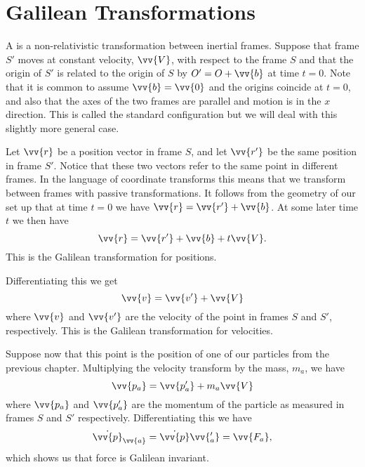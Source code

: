 \documentclass[fleqn]{NotesClass}
\begin{document}
    \section{Galilean Transformations}
    A  is a non-relativistic transformation between inertial frames.
    Suppose that frame \(S'\) moves at constant velocity, \(\vv{V}\), with respect to the frame \(S\) and that the origin of \(S'\) is related to the origin of \(S\) by \(O' = O + \vv{b}\) at time \(t = 0\).
    Note that it is common to assume \(\vv{b} = \vv{0}\) and the origins coincide at \(t = 0\), and also that the axes of the two frames are parallel and motion is in the \(x\) direction.
    This is called the standard configuration but we will deal with this slightly more general case.
    
    Let \(\vv{r}\) be a position vector in frame \(S\), and let \(\vv{r'}\) be the same position in frame \(S'\).
    Notice that these two vectors refer to the same point in different frames.
    In the language of coordinate transforms this means that we transform between frames with passive transformations.
    It follows from the geometry of our set up that at time \(t = 0\) we have \(\vv{r} = \vv{r'} + \vv{b}\).
    At some later time \(t\) we then have 
    \begin{equation}
        \vv{r} = \vv{r'} + \vv{b} + t\vv{V}.
    \end{equation}
    This is the Galilean transformation for positions.
    
    Differentiating this we get
    \begin{equation}
        \vv{v} = \vv{v'} + \vv{V}
    \end{equation}
    where \(\vv{v}\) and \(\vv{v'}\) are the velocity of the point in frames \(S\) and \(S'\), respectively.
    This is the Galilean transformation for velocities.
    
    Suppose now that this point is the position of one of our particles from the previous chapter.
    Multiplying the velocity transform by the mass, \(m_a\), we have
    \begin{equation}
        \vv{p_a} = \vv{p_a'} + m_a\vv{V}
    \end{equation}
    where \(\vv{p_a}\) and \(\vv{p_a'}\) are the momentum of the particle as measured in frames \(S\) and \(S'\) respectively.
    Differentiating this we have
    \begin{equation}
        \dot{\vv{p}}_{\vv{a}} = \dot{\vv{p}}\vv{_a'} = \vv{F_a},
    \end{equation}
    which shows us that force is Galilean invariant.
    
\end{document}
